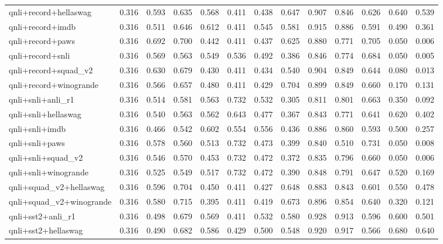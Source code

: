 \begin{table}[t]
\begin{tabular}{lrrrrrrrrrrrr}
    qnli+record+hellaswag & 0.316 & 0.593 & 0.635 & 0.568 & 0.411 & 0.438 & 0.647 & 0.907 & 0.846 & 0.626 & 0.640 & 0.539 \\
    qnli+record+imdb & 0.316 & 0.511 & 0.646 & 0.612 & 0.411 & 0.545 & 0.581 & 0.915 & 0.886 & 0.591 & 0.490 & 0.361 \\
    qnli+record+paws & 0.316 & 0.692 & 0.700 & 0.442 & 0.411 & 0.437 & 0.625 & 0.880 & 0.771 & 0.705 & 0.050 & 0.006 \\
    qnli+record+snli & 0.316 & 0.569 & 0.563 & 0.549 & 0.536 & 0.492 & 0.386 & 0.846 & 0.774 & 0.684 & 0.050 & 0.005 \\
    qnli+record+squad\_v2 & 0.316 & 0.630 & 0.679 & 0.430 & 0.411 & 0.434 & 0.540 & 0.904 & 0.849 & 0.644 & 0.080 & 0.013 \\
    qnli+record+winogrande & 0.316 & 0.566 & 0.657 & 0.480 & 0.411 & 0.429 & 0.704 & 0.899 & 0.849 & 0.660 & 0.170 & 0.131 \\
    qnli+snli+anli\_r1 & 0.316 & 0.514 & 0.581 & 0.563 & 0.732 & 0.532 & 0.305 & 0.811 & 0.801 & 0.663 & 0.350 & 0.092 \\
    qnli+snli+hellaswag & 0.316 & 0.540 & 0.563 & 0.562 & 0.643 & 0.477 & 0.367 & 0.843 & 0.771 & 0.641 & 0.620 & 0.402 \\
    qnli+snli+imdb & 0.316 & 0.466 & 0.542 & 0.602 & 0.554 & 0.556 & 0.436 & 0.886 & 0.860 & 0.593 & 0.500 & 0.257 \\
    qnli+snli+paws & 0.316 & 0.578 & 0.560 & 0.513 & 0.732 & 0.473 & 0.399 & 0.840 & 0.510 & 0.731 & 0.050 & 0.008 \\
    qnli+snli+squad\_v2 & 0.316 & 0.546 & 0.570 & 0.453 & 0.732 & 0.472 & 0.372 & 0.835 & 0.796 & 0.660 & 0.050 & 0.006 \\
    qnli+snli+winogrande & 0.316 & 0.525 & 0.549 & 0.517 & 0.732 & 0.472 & 0.390 & 0.848 & 0.791 & 0.647 & 0.520 & 0.169 \\
    qnli+squad\_v2+hellaswag & 0.316 & 0.596 & 0.704 & 0.450 & 0.411 & 0.427 & 0.648 & 0.883 & 0.843 & 0.601 & 0.550 & 0.478 \\
    qnli+squad\_v2+winogrande & 0.316 & 0.580 & 0.715 & 0.395 & 0.411 & 0.419 & 0.673 & 0.896 & 0.854 & 0.640 & 0.320 & 0.121 \\
    qnli+sst2+anli\_r1 & 0.316 & 0.498 & 0.679 & 0.569 & 0.411 & 0.532 & 0.580 & 0.928 & 0.913 & 0.596 & 0.600 & 0.501 \\
    qnli+sst2+hellaswag & 0.316 & 0.490 & 0.682 & 0.586 & 0.429 & 0.500 & 0.548 & 0.920 & 0.917 & 0.566 & 0.680 & 0.640 \\

\end{tabular}
\end{table}
